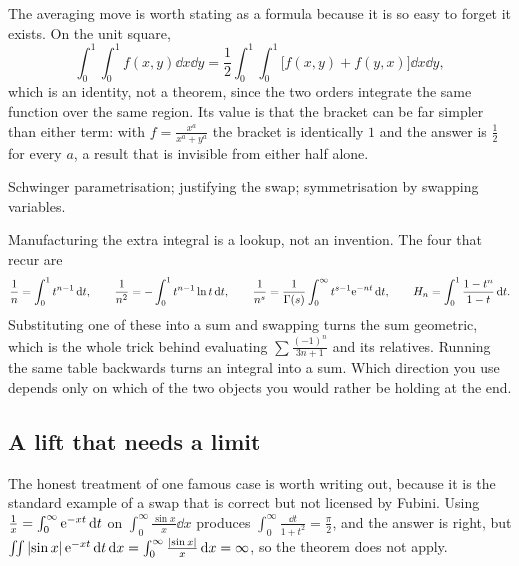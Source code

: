 \begin{keynote}
The averaging move is worth stating as a formula because it is so easy to forget it exists. On the unit square,
\[\int_0^1\!\!\int_0^1 f(x,y)\dd x\dd y=\frac12\int_0^1\!\!\int_0^1\bigl[f(x,y)+f(y,x)\bigr]\dd x\dd y,\]
which is an identity, not a theorem, since the two orders integrate the same function over the same region. Its value is that the bracket can be far simpler than either term: with $f=\frac{x^{a}}{x^{a}+y^{a}}$ the bracket is identically $1$ and the answer is $\tfrac12$ for every $a$, a result that is invisible from either half alone.
\end{keynote}

\begin{seealsob}Schwinger parametrisation; justifying the swap; symmetrisation by swapping variables.\end{seealsob}

\begin{keynote}
Manufacturing the extra integral is a lookup, not an invention. The four that recur are
\[\frac1n=\int_0^1t^{n-1}\,\mathrm{d} t,\qquad \frac{1}{n^{2}}=-\int_0^1t^{n-1}\ln t\,\mathrm{d} t,\qquad \frac{1}{n^{s}}=\frac{1}{\Gamma(s)}\int_0^{\infty}t^{s-1}\mathrm{e}^{-nt}\,\mathrm{d} t,\qquad H_n=\int_0^1\frac{1-t^{n}}{1-t}\,\mathrm{d} t.\]
Substituting one of these into a sum and swapping turns the sum geometric, which is the whole trick behind evaluating $\sum\frac{(-1)^{n}}{3n+1}$ and its relatives. Running the same table backwards turns an integral into a sum. Which direction you use depends only on which of the two objects you would rather be holding at the end.
\end{keynote}

\subsection{A lift that needs a limit}

The honest treatment of one famous case is worth writing out, because it is the standard example of a swap that is correct but not licensed by Fubini. Using $\frac1x=\int_0^\infty \mathrm{e}^{-xt}\,\mathrm{d} t$ on $\int_0^\infty\frac{\sin x}{x}\dd x$ produces $\int_0^\infty\frac{\dd t}{1+t^{2}}=\frac{\pi}{2}$, and the answer is right, but $\iint\left\lvert \sin x\right\rvert\mathrm{e}^{-xt}\,\mathrm{d} t\,\mathrm{d} x=\int_0^\infty\frac{\left\lvert \sin x\right\rvert}{x}\,\mathrm{d} x=\infty$, so the theorem does not apply.


